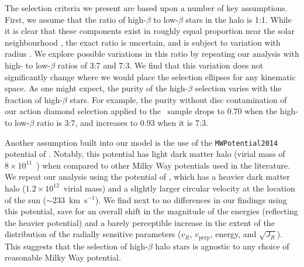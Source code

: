 The selection criteria we present are based upon a number of key assumptions. First, we assume that the ratio of high-$\beta$ to low-$\beta$ stars in the halo is 1:1. While it is clear that these components exist in roughly equal proportion near the solar neighbourhood \parencite{belokurov18,lancaster19,iorio21}, the exact ratio is uncertain, and is subject to variation with radius \parencite{iorio21}. We explore possible variations in this ratio by repeating our analysis with high- to low-$\beta$ ratios of 3:7 and 7:3. We find that this variation does not significantly change where we would place the selection ellipses for any kinematic space. As one might expect, the purity of the high-$\beta$ selection varies with the fraction of high-$\beta$ stars. For example, the purity without disc contamination of our action diamond selection applied to the \survey\ sample drops to 0.70 when the high- to low-$\beta$ ratio is 3:7, and increases to 0.93 when it is 7:3.

Another assumption built into our model is the use of the \texttt{MWPotential2014} potential of \textcite{bovy14}. Notably, this potential has light dark matter halo (virial mass of $8\times10^{11}$~\Msun) when compared to other Milky Way potentials used in the literature. We repeat our analysis using the potential of \textcite{mcmillan17}, which has a heavier dark matter halo ($1.2\times10^{12}$~\Msun virial mass) and a slightly larger circular velocity at the location of the sun ($\sim 233$~km~s$^{-1}$). We find next to no differences in our findings using this potential, save for an overall shift in the magnitude of the energies (reflecting the heavier potential) and a barely perceptible increase in the extent of the distribution of the radially sensitive parameters ($v_{R}$, $v_{\mathrm{perp}}$, energy, and $\sqrt{J_{R}}$). This suggests that the selection of high-$\beta$ halo stars is agnostic to any choice of reasonable Milky Way potential.

